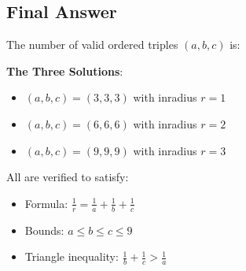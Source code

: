 \documentclass[12pt]{article}
\begin{document}
\subsection*{Final Answer}

The number of valid ordered triples $(a, b, c)$ is:

\begin{center}
\end{center}

\textbf{The Three Solutions}:
\begin{itemize}
    \item $(a, b, c) = (3, 3, 3)$ with inradius $r = 1$
    \item $(a, b, c) = (6, 6, 6)$ with inradius $r = 2$
    \item $(a, b, c) = (9, 9, 9)$ with inradius $r = 3$
\end{itemize}

All are verified to satisfy:
\begin{itemize}
    \item Formula: $\frac{1}{r} = \frac{1}{a} + \frac{1}{b} + \frac{1}{c}$ \checkmark
    \item Bounds: $a \leq b \leq c \leq 9$ \checkmark
    \item Triangle inequality: $\frac{1}{b} + \frac{1}{c} > \frac{1}{a}$ \checkmark
\end{itemize}
\end{document}
